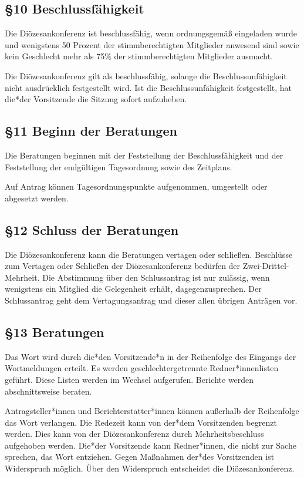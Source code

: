 \documentclass[12pt]{report}
\begin{document}
\begin{flushleft}
\subsection*{§10 Beschlussfähigkeit}
Die Diözesankonferenz ist beschlussfähig, wenn ordnungsgemäß eingeladen wurde und wenigstens 50 Prozent
der stimmberechtigten Mitglieder anwesend sind sowie kein Geschlecht mehr als 75\% der stimmberechtigten Mitglieder ausmacht.

Die Diözesankonferenz gilt als beschlussfähig, solange die Beschlussunfähigkeit nicht ausdrücklich
festgestellt wird. Ist die Beschlussunfähigkeit festgestellt, hat die*der Vorsitzende die Sitzung sofort aufzuheben.

\subsection*{§11 Beginn der Beratungen}
Die Beratungen beginnen mit der Feststellung der Beschlussfähigkeit und der Feststellung der endgültigen
Tagesordnung sowie des Zeitplans.

Auf Antrag können Tagesordnungspunkte aufgenommen, umgestellt oder abgesetzt werden.
\subsection*{§12 Schluss der Beratungen}
Die Diözesankonferenz kann die Beratungen vertagen oder schließen. Beschlüsse zum Vertagen oder Schließen
der Diözesankonferenz bedürfen der Zwei-Drittel-Mehrheit. Die Abstimmung über den Schlussantrag ist
nur zulässig, wenn wenigstens ein Mitglied die Gelegenheit erhält, dagegenzusprechen. Der Schlussantrag
geht dem Vertagungsantrag und dieser allen übrigen Anträgen vor.
\subsection*{§13 Beratungen}
Das Wort wird durch die*den Vorsitzende*n in der Reihenfolge des Eingangs der Wortmeldungen erteilt.
Es werden geschlechtergetrennte Redner*innenlisten geführt. Diese Listen werden im Wechsel aufgerufen.
Berichte werden abschnittsweise beraten.

Antragsteller*innen und Berichterstatter*innen können außerhalb der Reihenfolge das Wort verlangen. Die Redezeit
kann von der*dem Vorsitzenden begrenzt werden. Dies kann von der Diözesankonferenz durch Mehrheitsbeschluss
aufgehoben werden. Die*der Vorsitzende kann Redner*innen, die nicht zur Sache sprechen, das
Wort entziehen. Gegen Maßnahmen der*des Vorsitzenden ist Widerspruch möglich. Über den Widerspruch
entscheidet die Diözesankonferenz.


\end{flushleft}
\end{document}
